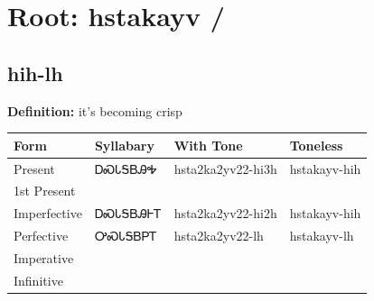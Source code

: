 \documentclass{article}%
\begin{document}
%
\normalsize%
\section*{Root: hstakayv / }%
\subsection*{hih-lh}%
\textbf{Definition: }%
it’s becoming crisp%
\\[0.5em]%
\begin{tabular}{|l|l|l|l|}%
\hline%
\textbf{Form}&\textbf{Syllabary}&\textbf{With Tone}&\textbf{Toneless}\\%
\hline%
Present&ᎠᏍᏓᎦᏴᎯᎭ&hsta2ka2yv22{-}hi3h&hstakayv{-}hih\\%
1st Present&&&\\%
Imperfective&ᎠᏍᏓᎦᏴᎯᎰᎢ&hsta2ka2yv22{-}hi2h&hstakayv{-}hih\\%
Perfective&ᎤᏍᏓᎦᏴᏢᎢ&hsta2ka2yv22{-}lh&hstakayv{-}lh\\%
Imperative&&&\\%
Infinitive&&&\\%
\hline%
\end{tabular}%
\\[1em]%
\end{document}
